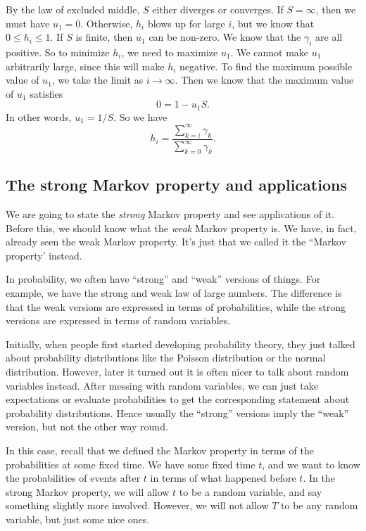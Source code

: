\documentclass[a4paper]{article}
\begin{document}
\begin{eg}
\[  \]
  By the law of excluded middle, $S$ either diverges or converges. If $S = \infty$, then we must have $u_1 = 0$. Otherwise, $h_i$ blows up for large $i$, but we know that $0 \leq h_i \leq 1$. If $S$ is finite, then $u_1$ can be non-zero. We know that the $\gamma_i$ are all positive. So to minimize $h_i$, we need to maximize $u_1$. We cannot make $u_1$ arbitrarily large, since this will make $h_i$ negative. To find the maximum possible value of $u_1$, we take the limit as $i \to\infty$. Then we know that the maximum value of $u_1$ satisfies
  \[
    0 = 1 - u_1 S.
  \]
  In other words, $u_1 = 1/S$. So we have
  \[
    h_i = \frac{\sum_{k = i}^\infty \gamma_k}{\sum_{k = 0}^\infty \gamma_k}.
  \]
\end{eg}

\subsection{The strong Markov property and applications}
We are going to state the \emph{strong} Markov property and see applications of it. Before this, we should know what the \emph{weak} Markov property is. We have, in fact, already seen the weak Markov property. It's just that we called it the ``Markov property' instead.

In probability, we often have ``strong'' and ``weak'' versions of things. For example, we have the strong and weak law of large numbers. The difference is that the weak versions are expressed in terms of probabilities, while the strong versions are expressed in terms of random variables.

Initially, when people first started developing probability theory, they just talked about probability distributions like the Poisson distribution or the normal distribution. However, later it turned out it is often nicer to talk about random variables instead. After messing with random variables, we can just take expectations or evaluate probabilities to get the corresponding statement about probability distributions. Hence usually the ``strong'' versions imply the ``weak'' version, but not the other way round.

In this case, recall that we defined the Markov property in terms of the probabilities at some fixed time. We have some fixed time $t$, and we want to know the probabilities of events after $t$ in terms of what happened before $t$. In the strong Markov property, we will allow $t$ to be a random variable, and say something slightly more involved. However, we will not allow $T$ to be any random variable, but just some nice ones.
\end{document}
